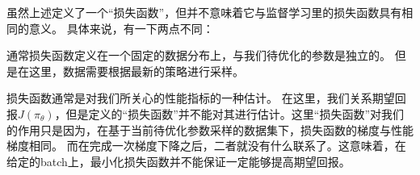 {} 虽然上述定义了一个“损失函数”，但并不意味着它与监督学习里的损失函数具有相同的意义。
具体来说，有一下两点不同：

 通常损失函数定义在一个固定的数据分布上，与我们待优化的参数是独立的。
但是在这里，数据需要根据最新的策略进行采样。

 损失函数通常是对我们所关心的性能指标的一种估计。
在这里，我们关系期望回报$J(\pi_\theta)$，但是定义的“损失函数”并不能对其进行估计。这里“损失函数”对我们的作用只是因为，在基于当前待优化参数采样的数据集下，损失函数的梯度与性能梯度相同。
而在完成一次梯度下降之后，二者就没有什么联系了。这意味着，在给定的batch上，最小化损失函数并不能保证一定能够提高期望回报。
